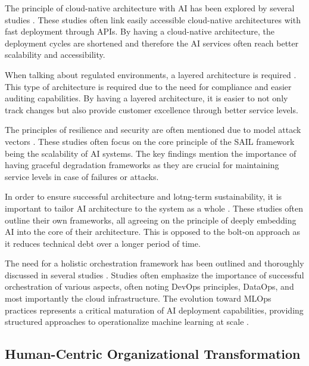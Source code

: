 \documentclass[]{imc-inf}
\begin{document}
The principle of cloud-native architecture with AI has been explored by several studies \citep{Shaban2025, Ali2018, Bhatia2025}. These studies often link easily accessible cloud-native architectures with fast deployment through APIs. By having a cloud-native architecture, the deployment cycles are shortened and therefore the AI services often reach better scalability and accessibility. 

When talking about regulated environments, a layered architecture is required \citep{Bhatia2025, Sundaramurthy2022}. This type of architecture is required due to the need for compliance and easier auditing capabilities. By having a layered architecture, it is easier to not only track changes but also provide customer excellence through better service levels.
 
The principles of resilience and security are often mentioned due to model attack vectors \citep{Sundaramurthy2022, Sharma2024, Hechler2020}. These studies often focus on the core principle of the SAIL framework being the scalability of AI systems. The key findings mention the importance of having graceful degradation frameworks as they are crucial for maintaining service levels in case of failures or attacks.

In order to ensure successful architecture and lotng-term sustainability, it is important to tailor AI architecture to the system as a whole \citep{Anny2024, Ali2018, Gupta2018}. These studies often outline their own frameworks, all agreeing on the principle of deeply embedding AI into the core of their architecture. This is opposed to the bolt-on approach as it reduces technical debt over a longer period of time. 

The need for a holistic orchestration framework has been outlined and thoroughly discussed in several studies \citep{Ali2018, Hechler2020, Shaban2025}. Studies often emphasize the importance of successful orchestration of various aspects, often noting DevOps principles, DataOps, and most importantly the cloud infrastructure. The evolution toward MLOps practices represents a critical maturation of AI deployment capabilities, providing structured approaches to operationalize machine learning at scale \citep{AWS2024, John2025}. 



\subsection{Human-Centric Organizational Transformation}
\end{document}
